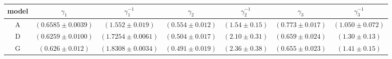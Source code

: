 \begin{tabular}{ccccccc}
\toprule
model & $\gamma_1$ & $\gamma_1^{-1}$ & $\gamma_2$ & $\gamma_2^{-1}$ & $\gamma_3$ & $\gamma_3^{-1}$ \\
\midrule
A & $ (0.6585\pm0.0039) $ & $ (1.552\pm0.019) $ & $ (0.554\pm0.012) $ & $ (1.54\pm0.15) $ & $ (0.773\pm0.017) $ & $ (1.050\pm0.072) $ \\
D & $ (0.6259\pm0.0100) $ & $ (1.7254\pm0.0061) $ & $ (0.504\pm0.017) $ & $ (2.10\pm0.31) $ & $ (0.659\pm0.024) $ & $ (1.30\pm0.13) $ \\
G & $ (0.626\pm0.012) $ & $ (1.8308\pm0.0034) $ & $ (0.491\pm0.019) $ & $ (2.36\pm0.38) $ & $ (0.655\pm0.023) $ & $ (1.41\pm0.15) $ \\
\bottomrule
\end{tabular}
